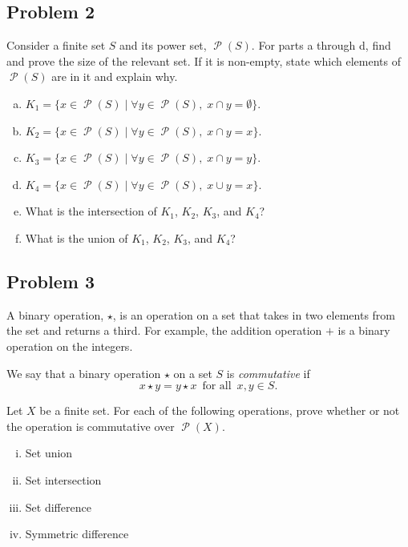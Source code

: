 \documentclass[12pt,letterpaper]{article}
\newcommand\Pow{\ensuremath{\operatorname{\mathcal{P}}}}
\newcounter{enum22i}
\begin{document}
\subsection*{Problem 2}
{
\nopagebreak 

{\setcounter{enum22i}{0}

        Consider a finite set $S$ and its power set, $ \Pow (S)$. For parts a through d, find and prove the size of the relevant set. If it is non-empty, state which elements of $\Pow(S)$ are in it and explain why.
        \begin{enumerate}[a.]
            \item $K_1=\{x \in \Pow (S) \; | \; \forall y \in \Pow (S), \; x \cap y = \emptyset \}$.
            \item $K_2=\{x \in \Pow (S) \; | \; \forall y \in \Pow (S), \; x \cap y = x \}$.
            \item $K_3=\{x \in \Pow (S) \; | \; \forall y \in \Pow (S), \;  x \cap y = y \}$.
            \item $K_4=\{x \in \Pow (S) \; | \; \forall y \in \Pow (S), \; x \cup y = x \}$.
            \item What is the intersection of $K_1$, $K_2$, $K_3$, and $K_4$?
            \item What is the union of $K_1$, $K_2$, $K_3$, and $K_4$?
        \end{enumerate}
}
}


\subsection*{Problem 3}
{
\nopagebreak 

{\setcounter{enum22i}{0}
A binary operation, $\star$, is an operation on a set that takes in two elements from the set and returns a third. For example, the addition operation $+$ is a binary operation on the integers.

We say that a binary operation $\star$ on a set $S$ is \textit{commutative}  if \[x\star y=y\star x \, \textrm{ for all } \, x,y\in S.\]

Let $X$ be a finite set. For each of the following operations, prove whether or not the operation is commutative over $\Pow(X)$.
\begin{enumerate}[i.]
	\item Set union
	\item Set intersection
	\item Set difference
	\item Symmetric difference
\end{enumerate}

}
}
\end{document}
